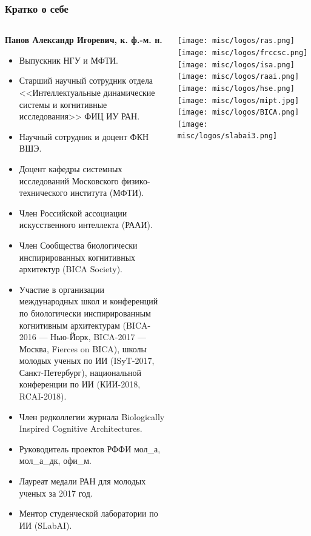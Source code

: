 \documentclass[default]{beamer}
\begin{document}
	\begin{frame}
		\frametitle{Кратко о себе}
		\scriptsize
		\begin{columns}
			\begin{column}{0.85\textwidth}
				\textbf{Панов Александр Игоревич, к. ф.-м. н.}
				\begin{itemize}
					\item Выпускник НГУ и МФТИ.
					\item Старший научный сотрудник отдела <<Интеллектуальные динамические системы и когнитивные исследования>> ФИЦ ИУ РАН.
					\item Научный сотрудник и доцент ФКН ВШЭ.
					\item Доцент кафедры системных исследований Московского физико-технического института (МФТИ).
					\item Член Российской ассоциации искусственного интеллекта (РААИ).
					\item Член Сообщества биологически инспирированных когнитивных архитектур (BICA Society).
					\item Участие в организации международных школ и конференций по биологически инспирированным когнитивным архитектурам (BICA-2016 --- Нью-Йорк, BICA-2017 --- Москва, Fierces on BICA), школы молодых ученых по ИИ (ISyT-2017, Санкт-Петербург), национальной конференции по ИИ (КИИ-2018, RCAI-2018).
					\item Член редколлегии журнала Biologically Inspired Cognitive Architectures.					
					\item Руководитель проектов РФФИ мол\_а, мол\_а\_дк, офи\_м.
					\item Лауреат медали РАН для молодых ученых за 2017 год.
					\item Ментор студенческой лаборатории по ИИ (SLabAI).
				\end{itemize}
			\end{column}
			
			\begin{column}{0.15\textwidth}
				\centering
				\texttt{[image: misc/logos/ras.png]}
				\vspace{7pt}
				\texttt{[image: misc/logos/frccsc.png]}
				\vspace{7pt}
				\texttt{[image: misc/logos/isa.png]}
				\vspace{7pt}
				\texttt{[image: misc/logos/raai.png]}
				\vspace{7pt}
				\texttt{[image: misc/logos/hse.png]}
				\vspace{7pt}
				\texttt{[image: misc/logos/mipt.jpg]}
				\vspace{5pt}
				\texttt{[image: misc/logos/BICA.png]}
				\vspace{5pt}
				\texttt{[image: misc/logos/slabai3.png]}
			\end{column}
			
		\end{columns}
	\end{frame}
\end{document}

